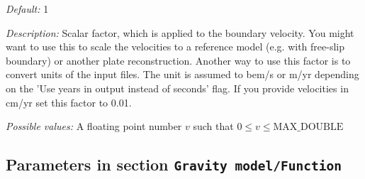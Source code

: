 \begin{itemize}
{\it Default:} 1


{\it Description:} Scalar factor, which is applied to the boundary velocity. You might want to use this to scale the velocities to a reference model (e.g. with free-slip boundary) or another plate reconstruction. Another way to use this factor is to convert units of the input files. The unit is assumed to bem/s or m/yr depending on the 'Use years in output instead of seconds' flag. If you provide velocities in cm/yr set this factor to 0.01.


{\it Possible values:} A floating point number $v$ such that $0 \leq v \leq \text{MAX\_DOUBLE}$
\end{itemize}

\subsection{Parameters in section \tt Gravity model/Function}
\label{parameters:Gravity_20model/Function}

